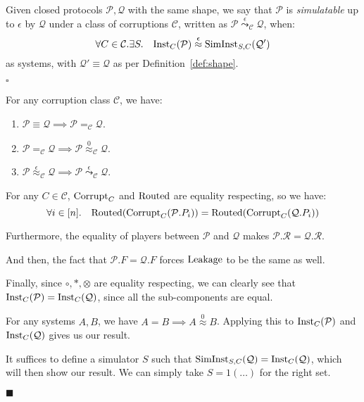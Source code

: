 \begin{definition}[Simulatability]
  Given closed protocols $\mathcal{P}, \mathcal{Q}$ with the same shape,
  we say that $\mathcal{P}$ is \emph{simulatable} up to $\epsilon$ by $\mathcal{Q}$
  under a class of corruptions $\mathcal{C}$,
  written as $\mathcal{P} \overset{\epsilon}{\leadsto}_{\mathcal{C}} \mathcal{Q}$,
  when:
  $$
  \forall C \in \mathcal{C}.\exists S.\quad \text{Inst}_C(\mathcal{P}) \overset{\epsilon}{\approx} \text{SimInst}_{S, C}(\mathcal{Q}')
  $$
  as systems, with $\mathcal{Q}' \equiv \mathcal{Q}$ as per 
  Definition~\ref{def:shape}.

  $\square$
\end{definition}

\begin{theorem}
  \label{thm:equality_hierarchy}
For any corruption class $\mathcal{C}$, we have:
\begin{enumerate}
\item $\mathcal{P} \equiv \mathcal{Q} \implies \mathcal{P} =_\mathcal{C} \mathcal{Q}$.
\item $\mathcal{P} =_{\mathcal{C}} \mathcal{Q} \implies \mathcal{P} \overset{0}{\approx}_\mathcal{C} \mathcal{Q}$.
\item $\mathcal{P} \overset{\epsilon}{\approx}_{\mathcal{C}} \mathcal{Q} \implies \mathcal{P} \overset{\epsilon}{\leadsto}_\mathcal{C} \mathcal{Q}$.
\end{enumerate}


For any $C \in \mathcal{C}$, $\text{Corrupt}_{C}$ and $\text{Routed}$ are equality respecting,
so we have:
$$
\forall i \in [n].\quad \text{Routed}(\text{Corrupt}_C(\mathcal{P}.P_i)) = 
\text{Routed}(\text{Corrupt}_C(\mathcal{Q}.P_i))
$$

Furthermore, the equality of players between $\mathcal{P}$ and $\mathcal{Q}$
makes $\mathcal{P}.\mathcal{R} = \mathcal{Q}.\mathcal{R}$.

And then, the fact that $\mathcal{P}.F = \mathcal{Q}.F$ forces $\text{Leakage}$
to be the same as well.

Finally, since $\circ, *, \otimes$ are equality respecting, we
can clearly see that $\text{Inst}_C(\mathcal{P}) = \text{Inst}_C(\mathcal{Q})$,
since all the sub-components are equal.

 For any systems $A, B$, we have $A = B \implies A \overset{0}{\approx} B$.
Applying this to $\text{Inst}_C(\mathcal{P})$ and $\text{Inst}_C(\mathcal{Q})$
gives us our result.

 It suffices to define a simulator $S$ such that
$\text{SimInst}_{S, C}(\mathcal{Q}) = \text{Inst}_C(\mathcal{Q})$,
which will then show our result.
We can simply take $S = 1(\ldots)$ for the right set.

$\blacksquare$
\end{theorem}

